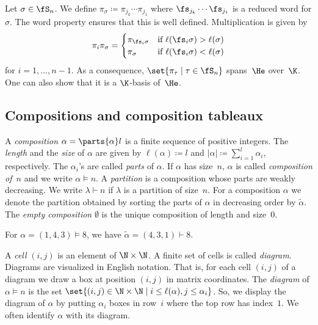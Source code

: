 Let $\sigma \in \fS_n$. We define $\pi_\sigma \coloneqq \pi_{j_k} \cdots \pi_{j_1}$ where $\fs_{j_k} \cdots \fs_{j_1}$ is a reduced word for $\sigma$. The word property ensures that this is well defined. Multiplication is given by
\begin{align*}
\pi_i \pi_\sigma = 
\begin{cases}
\pi_{\fs_i \sigma} & \text{if}\ \ell(\fs_i \sigma ) > \ell(\sigma) \\
\pi_{\sigma} & \text{if}\ \ell(\fs_i \sigma ) < \ell(\sigma) \\
\end{cases}
\end{align*}
for $i = 1,\dots, n-1$. 
As a consequence, $\set{\pi_{\tau} \mid \tau \in \fS_n}$ spans~$\He$ over~$\K$. One can also show that it is a $\K$-basis of~$\He$.%


\subsection{Compositions and composition tableaux}
\label{sec:compositions_and_composition_tableaux}

A \emph{composition} $\alpha = \parts{\alpha}l$ is a finite sequence of positive integers. 
The \emph{length} and the \emph{size} of $\alpha$ are given by $\ell(\alpha)\coloneqq l$ and $|\alpha| \coloneqq \sum_{i=1}^l \alpha_i$, respectively.
The $\alpha_i$'s are called \emph{parts} of $\alpha$. If $\alpha$ has size~$n$, $\alpha$ is called \emph{composition of~$n$} and we write $\alpha \vDash n$.
A \emph{partition} is a composition whose parts are weakly decreasing. 
We write $\lambda \vdash n$ if $\lambda$ is a partition of size~$n$.
For a composition $\alpha$ we denote the partition obtained by sorting the parts of $\alpha$ in decreasing order by $\widetilde \alpha$. The \emph{empty composition} $\emptyset$ is the unique composition of length and size~$0$.

\begin{exam} 
	For $\alpha=(1,4,3)\vDash 8$, we have $\widetilde \alpha = (4,3,1)\vdash 8$.
\end{exam}

A \emph{cell} $(i,j)$ is an element of $\N \times \N$.
A finite set of cells is called \emph{diagram}. Diagrams are visualized in English notation. That is, for each cell $(i,j)$ of a diagram we draw a box at position $(i,j)$ in matrix coordinates.
The \emph{diagram} of $\alpha\vDash n$ is the set $\set{(i,j)\in \N \times \N \mid i \leq \ell(\alpha), j \leq \alpha_i}$. So, we display the diagram of $\alpha$ by putting $\alpha_i$ boxes in row~$i$ where the top row has index~$1$.
We often identify $\alpha$ with its diagram.

